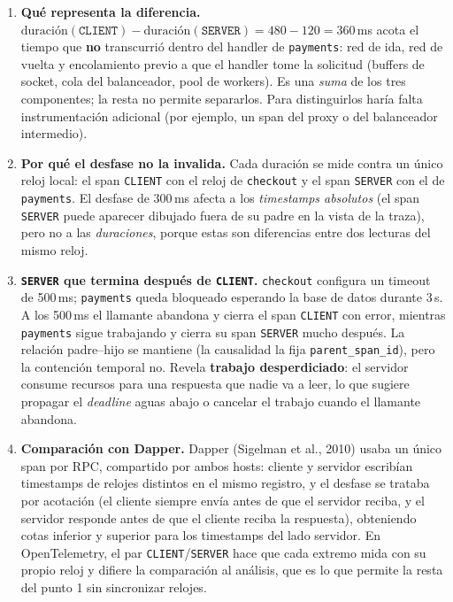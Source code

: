 \documentclass[variant=guia,cover=institutional,mode=screen]{ua-engineering-v6-article}
\begin{document}
\begin{uaanswer}
\begin{enumerate}
\item \textbf{Qué representa la diferencia.} $\text{duración}(\texttt{CLIENT}) - \text{duración}(\texttt{SERVER}) = 480 - 120 = 360$\,ms acota el tiempo que \textbf{no} transcurrió dentro del handler de \texttt{payments}: red de ida, red de vuelta y encolamiento previo a que el handler tome la solicitud (buffers de socket, cola del balanceador, pool de workers). Es una \emph{suma} de los tres componentes; la resta no permite separarlos. Para distinguirlos haría falta instrumentación adicional (por ejemplo, un span del proxy o del balanceador intermedio).
\item \textbf{Por qué el desfase no la invalida.} Cada duración se mide contra un único reloj local: el span \texttt{CLIENT} con el reloj de \texttt{checkout} y el span \texttt{SERVER} con el de \texttt{payments}. El desfase de 300\,ms afecta a los \emph{timestamps absolutos} (el span \texttt{SERVER} puede aparecer dibujado fuera de su padre en la vista de la traza), pero no a las \emph{duraciones}, porque estas son diferencias entre dos lecturas del mismo reloj.
\item \textbf{\texttt{SERVER} que termina después de \texttt{CLIENT}.} \texttt{checkout} configura un timeout de 500\,ms; \texttt{payments} queda bloqueado esperando la base de datos durante 3\,s. A los 500\,ms el llamante abandona y cierra el span \texttt{CLIENT} con error, mientras \texttt{payments} sigue trabajando y cierra su span \texttt{SERVER} mucho después. La relación padre--hijo se mantiene (la causalidad la fija \texttt{parent\_span\_id}), pero la contención temporal no. Revela \textbf{trabajo desperdiciado}: el servidor consume recursos para una respuesta que nadie va a leer, lo que sugiere propagar el \emph{deadline} aguas abajo o cancelar el trabajo cuando el llamante abandona.
\item \textbf{Comparación con Dapper.} Dapper (Sigelman et al., 2010) usaba un único span por RPC, compartido por ambos hosts: cliente y servidor escribían timestamps de relojes distintos en el mismo registro, y el desfase se trataba por acotación (el cliente siempre envía antes de que el servidor reciba, y el servidor responde antes de que el cliente reciba la respuesta), obteniendo cotas inferior y superior para los timestamps del lado servidor. En OpenTelemetry, el par \texttt{CLIENT}/\texttt{SERVER} hace que cada extremo mida con su propio reloj y difiere la comparación al análisis, que es lo que permite la resta del punto 1 sin sincronizar relojes.
\end{enumerate}
\end{uaanswer}
\end{document}
